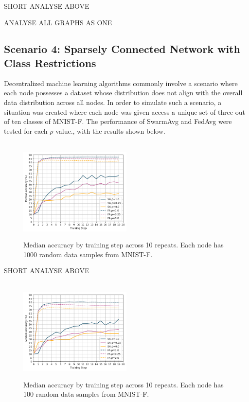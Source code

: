 \documentclass[letterpaper, 10 pt, conference]{ieeeconf}  %
\begin{document}
SHORT ANALYSE ABOVE

ANALYSE ALL GRAPHS AS ONE

\subsection{Scenario 4: Sparsely Connected Network with Class Restrictions}
Decentralized machine learning algorithms commonly involve a scenario where each node possesses a dataset whose distribution does not align with the overall data distribution across all nodes. In order to simulate such a scenario, a situation was created where each node was given access a unique set of three out of ten classes of MNIST-F. The performance of SwarmAvg and FedAvg were tested for each $\rho$ value., with the results shown below.


\begin{figure}[H]
	 \\
	\includegraphics[width=0.5\textwidth]{conf_sparse_ns1000_cl3}
	\caption{Median accuracy by training step across 10 repeats. Each node has 1000 random data samples from MNIST-F.}
	\label{aeg7}
\end{figure}

SHORT ANALYSE ABOVE

\begin{figure}[H] 
	 \\
	\includegraphics[width=0.5\textwidth]{conf_sparse_ns100_cl3}
	\caption{Median accuracy by training step across 10 repeats. Each node has 100 random data samples from MNIST-F.}
	\label{aeg8}
\end{figure}
\end{document}
